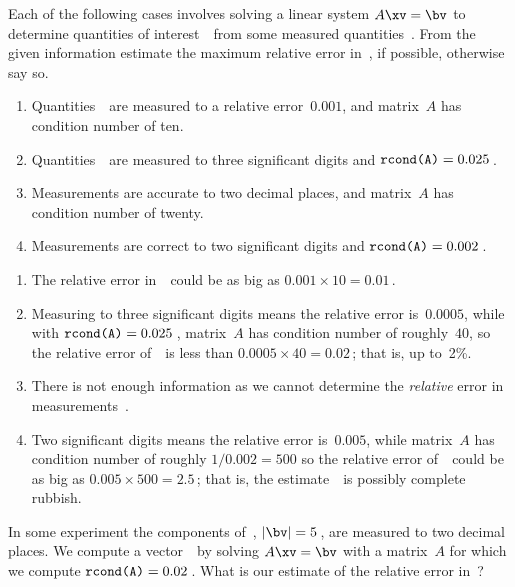 \begin{example} \label{eg:}
Each of the following cases involves solving a linear system \(A\xv=\bv\) to determine quantities of interest~\xv\ from some measured quantities~\bv.
From the given information estimate the maximum relative error in~\xv,  if  possible, otherwise say so.
\begin{enumerate}
\item Quantities~\bv\ are measured to a relative error~\(0.001\), and matrix~\(A\) has condition number of ten.
\item Quantities~\bv\ are measured to three significant digits and \(\verb|rcond(A)|=0.025\)\,.
\item Measurements are accurate to two decimal places, and matrix~\(A\) has condition number of twenty.
\item  Measurements are correct to two significant digits and \(\verb|rcond(A)|=0.002\)\,.
\end{enumerate}

\begin{solution} 
\begin{enumerate}
\item The relative error in~\xv\ could be as big as \(0.001\times10=0.01\)\,.
\item Measuring to three significant digits means the relative error is~\(0.0005\), while with \(\verb|rcond(A)|=0.025\)\,, matrix~\(A\) has condition number of roughly~\(40\), so the relative error of~\xv\ is less than \(0.0005\times40=0.02\)\,; that is, up to~2\%.
\item There is not enough information as we cannot determine the \emph{relative} error in measurements~\bv.
\item Two significant digits means the relative error is~\(0.005\), while matrix~\(A\) has condition number of roughly \(1/0.002=500\) so the relative error of~\xv\ could be as big as \(0.005\times500=2.5\)\,; that is, the estimate~\xv\ is possibly complete rubbish.
\end{enumerate}
\end{solution}
\end{example}




\begin{activity}
In some experiment the components of~\bv, \(|\bv|=5\)\,, are measured to two decimal places.
We compute a vector~\xv\ by solving \(A\xv=\bv\) with a matrix~\(A\) for which we compute \(\verb|rcond(A)|=0.02\)\,.
What is our estimate of the relative error in~\xv?
\end{activity}





